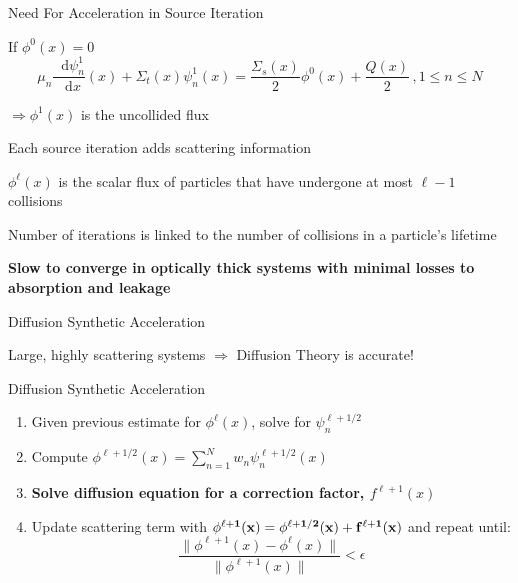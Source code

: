 \documentclass[10pt]{beamer}
\newcommand{\ud}{\mathop{}\!\mathrm{d}} %
\newcommand{\dderiv}[2]{\frac{\ud #1}{\ud #2}}
\begin{document}
\begin{frame}{Need For Acceleration in Source Iteration}

    If $\phi^0(x) = 0$
    \begin{equation*}
        \mu_n \dderiv{\psi_n^{1}}{x}(x) + \Sigma_t(x) \psi_n^{1}(x) =
        \frac{\Sigma_s(x)}{2} \phi^{0}(x) + \frac{Q(x)}{2} \,, 1 \leq n \leq N 
    \end{equation*}      

    $\Rightarrow \phi^1(x) $ is the uncollided flux 

    Each source iteration adds scattering information 

    $\phi^{\ell}(x)$ is the scalar flux of particles that have undergone at most $\ell - 1$ collisions 

    Number of iterations is linked to the number of collisions in a particle's lifetime 

    \textbf{Slow to converge in optically thick systems with minimal losses to absorption and leakage}

\end{frame}

\begin{frame}{Diffusion Synthetic Acceleration}

    Large, highly scattering systems $\Rightarrow$ Diffusion Theory is accurate! 


    \begin{exampleblock}{Diffusion Synthetic Acceleration}
    \begin{enumerate}
        \item Given previous estimate for $\phi^{\ell}(x)$, solve for $\psi_n^{\ell+1/2}$

        \item Compute $\phi^{\ell+1/2}(x) = 
            \sum_{n=1}^N w_n \psi_n^{\ell+1/2}(x)$ 

        \item \textbf{Solve diffusion equation for a correction factor, $f^{\ell+1}(x)$}

        \item Update scattering term with 
            $\bf{\phi^{\ell+1}(x) = \phi^{\ell+1/2}(x) + f^{\ell+1}(x)}$ 
        and repeat until: 
             \begin{equation*}
                \frac{\|\phi^{\ell+1}(x) - \phi^{\ell}(x)\|}{\|\phi^{\ell+1}(x)\|} < \epsilon 
             \end{equation*}

    \end{enumerate}
    \end{exampleblock}

\end{frame}
\end{document}
